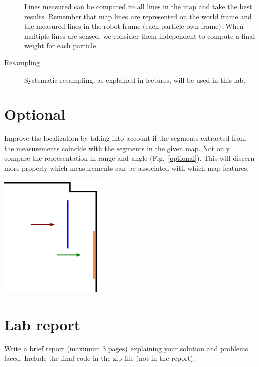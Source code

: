 \documentclass[a4paper,10pt]{article}
\begin{document}
\begin{description}
    Lines measured can be compared to all lines in the map and take the best results. Remember that map lines are represented on the world frame and the measured lines in the robot frame (each particle own frame). When multiple lines are sensed, we consider them independent to compute a final weight for each particle.
    
    \item[Resampling] Systematic resampling, as explained in lectures, will be used in this lab.
\end{description}

\section{Optional}

Improve the localization by taking into account if the segments extracted from the measurements coincide with the segments in the given map. Not only compare the representation in range and angle (Fig.~\ref{optional}). This will discern more properly which measurements can be associated with which map features.

\begin{center}
	\includegraphics[width=0.40\textwidth]{pict/lab3-optional}
	\label{optional}
\end{center}

\section{Lab report}

Write a brief report (maximum 3 pages) explaining your solution and problems faced. Include the final code in the zip file (not in the report).
\end{document}
